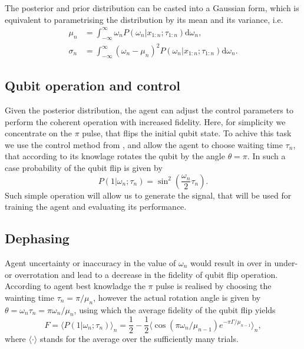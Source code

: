 \documentclass[aps,twocolumn,pra,notitlepage,]{revtex4-2}
\begin{document}
The posterior and prior distribution can be casted into a Gaussian form, which is equivalent to parametrising the distribution by its mean and its variance, i.e. 
\begin{align}
    \mu_n &= \int_{-\infty}^{\infty} \omega_n  P(\omega_n|x_{1:n};\tau_{1:n}) \text{d}\omega_n, \nonumber \\ \sigma_n &= \int_{-\infty}^{\infty} (\omega_n - \mu_n)^2  P(\omega_n|x_{1:n};\tau_{1:n}) \text{d}\omega_n.
\end{align}

\subsection{Qubit operation and control}
Given the posterior distribution, the agent can adjust the control parameters to perform the coherent operation with increased fidelity. Here, for simplicity we concentrate on the $\pi$ pulse, that flips the initial qubit state. To achive this task we use the control method from \cite{}, and allow the agent to choose waiting time $\tau_{n}$, that according to its knowlage rotates the qubit by the angle $\theta = \pi$. In such a case probability of the qubit flip is given by
\begin{equation}
    P(1|\omega_n;\tau_n) = \sin^2\left(\frac{\omega_n}{2}\tau_n\right).
\end{equation}
Such simple operation will allow us to generate the signal, that will be used for training the agent and evaluating its performance. 

\subsection{Dephasing}
Agent uncertainty or inaccuracy in the value of $\omega_n$ would result in over in under- or overrotation and lead to a decrease in the fidelity of qubit flip operation. According to agent best knowladge the $\pi$ pulse is realised by choosing the wainting time $\tau_n = \pi/\mu_n$, however the actual rotation angle is given by $\theta = \omega_n \tau_n = \pi \omega_n/\mu_n$, using which the average fidelity of the qubit flip yields
\begin{equation}
 F  = \langle P(1|\omega_n;\tau_n) \rangle_n = \frac{1}{2} - \frac{1}{2}\big\langle \cos(\pi \omega_n/\mu_{n-1})e^{-\pi\Gamma/\mu_{n-1}} \big\rangle_n,
\end{equation}
where $\langle \cdot \rangle$ stands for the average over the sufficiently many trials. 
\end{document}

